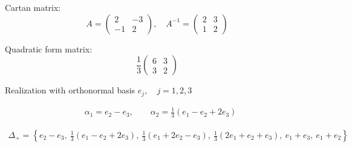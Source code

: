 \documentclass[12pt]{article}
\begin{document}
Cartan matrix:
\[
A=\left(
\begin{array}{cc}
 2 & -3 \\
 -1& 2
\end{array}
\right),\quad
A^{-1}=\left(
\begin{array}{cc}
 2 & 3 \\
 1& 2
\end{array}
\right)
\]

Quadratic form matrix:
\[\frac{1}{3}
\left(
\begin{array}{cc}
 6& 3 \\
 3& 2
\end{array}
\right)
\]

Realization with orthonormal basis $e_j,\quad j=1,2,3$

\begin{align*}
  &\alpha_1=e_2-e_3,\qquad
  \alpha_2=\frac13(e_1-e_2+2e_3)
\end{align*}

\begin{align*}
 \Delta_{+}=\left\{e_2-e_3,\ \frac13(e_1-e_2+2e_3),\ \frac13(e_1+2e_2-e_3),\
   \frac13(2e_1+e_2+e_3),\ e_1+e_3,\ e_1+e_2
  \right\}
\end{align*}
\end{document}
